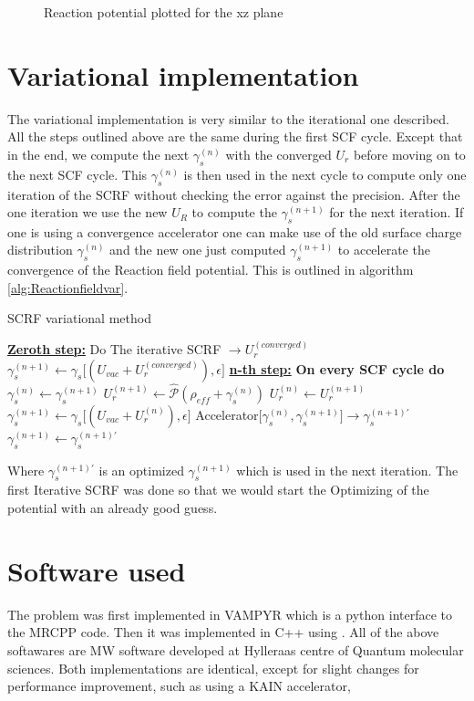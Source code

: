 \documentclass[../master_thesis.tex]{subfiles}
\begin{document}
\begin{figure}[h!]
\begin{subfigure}[b]{\linewidth}
  \end{subfigure}
  \caption{Reaction potential plotted for the xz plane}
  \label{fig:watpots}
\end{figure}

\section{Variational implementation}
The variational implementation is very similar to the iterational one described.
All the steps outlined above are the same during the first \ac{SCF} cycle. Except
that in the end, we compute the next $\gamma_s^{(n)}$ with the converged $U_r$ before
moving on to the next \ac{SCF} cycle. This $\gamma_s^{(n)}$ is then used in the next cycle
to compute only one iteration of the \ac{SCRF} without checking the error against the
precision. After the one iteration we use the new $U_R$ to compute the $\gamma_s^{(n+1)}$
for the next iteration. If one is using a convergence accelerator one can make
use of the old surface charge distribution $\gamma_s^{(n)}$ and the new one just computed
$\gamma_s^{(n+1)}$ to accelerate the convergence of the Reaction field potential.
This is outlined in algorithm \ref{alg:Reactionfieldvar}.
\begin{algorithm}
  \caption{\ac{SCRF} variational method}\label{alg:Reactionfieldvar}
  \begin{algorithmic}
    \STATE \underline{\textbf{Zeroth step:}}
    \STATE Do The iterative \ac{SCRF} $\rightarrow U_r^{(converged)}$
    \STATE $\gamma_s^{(n+1)} \leftarrow \gamma_s\big[(U_{vac}+ U_r^{(converged)}), \epsilon\big]$
    \STATE \underline{\textbf{n-th step:}}
    \STATE \textbf{On every SCF cycle do}
    \STATE $\gamma_s^{(n)} \leftarrow \gamma_s^{(n+1)}$
    \STATE $U_r^{(n+1)} \leftarrow \hat{\mathscr{P}} (\rho_{eff} + \gamma_s^{(n)})$
    \STATE $U_r^{(n)} \leftarrow U_r^{(n+1)}$
    \STATE $\gamma_s^{(n+1)} \leftarrow \gamma_s\big[(U_{vac}+ U_r^{(n)}), \epsilon\big]$
    \STATE Accelerator[$\gamma_s^{(n)}, \gamma_s^{(n+1)}] \rightarrow \gamma_s^{(n+1)\prime}$
    \STATE $\gamma_s^{(n+1)} \leftarrow\gamma_s^{(n+1)\prime}$
  \end{algorithmic}
\end{algorithm}
Where $\gamma_s^{(n+1)\prime}$ is an optimized $\gamma_s^{(n+1)}$ which is used
in the next iteration. The first Iterative \ac{SCRF} was done so that we would
start the Optimizing of the potential with an already good guess.
\section{Software used}
The problem was first implemented in VAMPYR \cite{Vampyr} which is a python interface to the
MRCPP \cite{MRCPP} code.  Then it was implemented in C++ using \mrchem \cite{MRchem}. All of the above softawares
are \ac{MW} software developed at Hylleraas centre of Quantum molecular sciences.
Both implementations are identical, except for slight changes for
performance improvement, such as using a KAIN accelerator, 


\biblio
\end{document}
